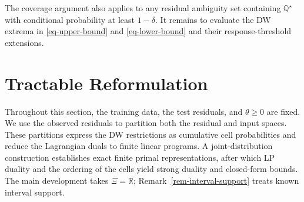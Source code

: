 \documentclass[review,11pt,3p,authoryear,nopreprintline]{elsarticle}
\begin{document}
The coverage argument also applies to any residual ambiguity set containing $\mathbb Q^\star$ with conditional probability at least $1-\delta$. It remains to evaluate the DW extrema in \eqref{eq-upper-bound} and \eqref{eq-lower-bound} and their response-threshold extensions.


\section{Tractable Reformulation}
\label{sec-reformulation}

Throughout this section, the training data, the test residuals, and $\theta\ge0$ are fixed. We use the observed residuals to partition both the residual and input spaces. These partitions express the DW restrictions as cumulative cell probabilities and reduce the Lagrangian duals to finite linear programs. A joint-distribution construction establishes exact finite primal representations, after which LP duality and the ordering of the cells yield strong duality and closed-form bounds. The main development takes $\Xi=\mathbb R$; Remark~\ref{rem-interval-support} treats known interval support.
\end{document}

